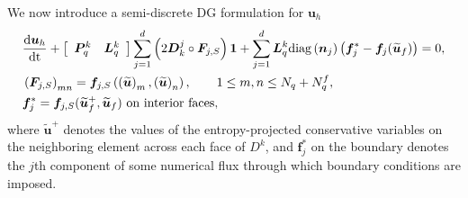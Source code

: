 \documentclass[preprint,10pt]{article}
\theoremstyle{definition}
\theoremstyle{lemma}
\theoremstyle{theorem}
\theoremstyle{assumption}
\renewcommand{\tilde}{\widetilde}
\newcommand{\td}[2]{\frac{{\rm d}#1}{{\rm d}{\rm #2}}}
\newcommand{\LRp}[1]{\left( #1 \right)}
\newcommand{\LRs}[1]{\left[ #1 \right]}
\newcommand{\diag}[1]{{\rm diag}\LRp{#1}}
\begin{document}
{We now introduce a semi-discrete DG formulation for $\bm{u}_h$
\begin{align}
&\td{\bm{u}_h}{t} + \LRs{\begin{array}{cc}\bm{P}^k_q & \bm{L}^k_q\end{array}}
  \sum_{j=1}^d \LRp{2\bm{D}^j_k \circ \bm{F}_{j,S}}\bm{1} + \sum_{j=1}^d \bm{L}^k_q \diag{\bm{n}_j}\LRp{\bm{f}_j^* - \bm{f}_j(\tilde{\bm{u}}_f)} = 0,\label{eq:dgform1}\\
  &\LRp{\bm{F}_{j,S}}_{mn} = \bm{f}_{j,S}\LRp{\LRp{\tilde{\bm{u}}}_m,\LRp{\tilde{\bm{u}}}_n}, \qquad 1 \leq m,n \leq N_q + N^f_q,\nonumber\\
  &\bm{f}_j^* = \bm{f}_{j,S}(\tilde{\bm{u}}_f^+,\tilde{\bm{u}}_f) \text{ on interior faces},\nonumber
\end{align}
where $\tilde{\bm{u}}^+$ denotes the values of the entropy-projected conservative variables on the neighboring element across each face of $D^k$, and $\bm{f}_j^*$ on the boundary denotes the $j$th component of some numerical flux through which boundary conditions are imposed.

}
\end{document}
